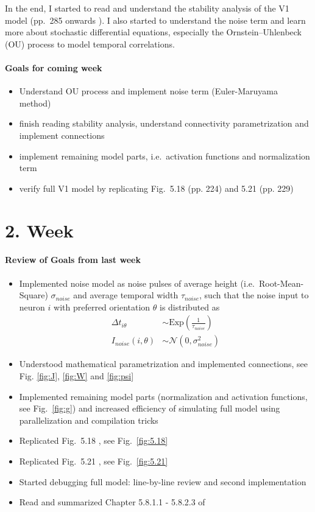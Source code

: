 In the end, I started to read and understand the stability analysis of the V1 model (pp.\ 285 onwards \cite{zhaoping_understanding_2014}). I also started to understand the noise term and learn more about stochastic differential equations, especially the Ornstein–Uhlenbeck (OU) process to model temporal correlations. 

\paragraph{Goals for coming week}
\begin{itemize}
    \item Understand OU process and implement noise term (Euler-Maruyama method)
    \item finish reading stability analysis, understand connectivity parametrization and implement connections
    \item implement remaining model parts, i.e.\ activation functions and normalization term
    \item verify full V1 model by replicating Fig.\ 5.18 (pp. 224) and 5.21 (pp. 229) \cite{zhaoping_understanding_2014}
\end{itemize}

\section*{2. Week}

\paragraph{Review of Goals from last week}

\begin{itemize}
	\item Implemented noise model as noise pulses of average height (i.e.\ Root-Mean-Square) $\sigma_{noise}$ and average temporal width $\tau_{noise}$, such that the noise input to neuron $i$ with preferred orientation $\theta$ is distributed as
		\begin{align*}
			\Delta t_{i \theta} &\sim \text{Exp}(\frac{1}{\tau_{noise}}) \\
			I_{noise}(i, \theta) &\sim \mathcal{N}(0, \sigma_{noise}^2)
		\end{align*}
	\item Understood mathematical parametrization and implemented connections, see Fig. \ref{fig:J}, \ref{fig:W} and \ref{fig:psi}
	\item Implemented remaining model parts (normalization and activation functions, see Fig.\ \ref{fig:g}) and increased efficiency of simulating full model using parallelization and compilation tricks
	\item Replicated Fig.\ 5.18 \cite{zhaoping_understanding_2014}, see Fig.\ \ref{fig:5.18} 
	\item Replicated Fig.\ 5.21 \cite{zhaoping_understanding_2014}, see Fig.\  \ref{fig:5.21}
	\item Started debugging full model: line-by-line review and second implementation 
	\item Read and summarized Chapter 5.8.1.1 - 5.8.2.3 of \cite{zhaoping_understanding_2014}
\end{itemize}

